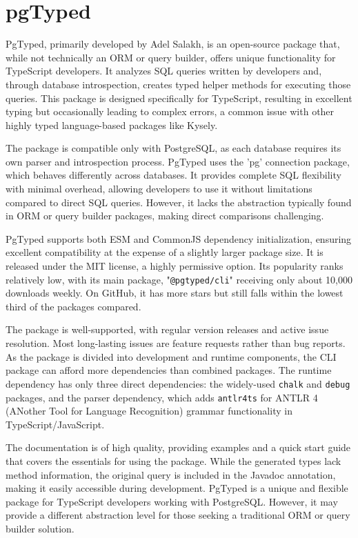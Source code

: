 \section{pgTyped}
PgTyped, primarily developed by Adel Salakh, is an open-source package that,
while not technically an ORM or query builder, offers unique functionality for
TypeScript developers. It analyzes SQL queries written by developers and,
through database introspection, creates typed helper methods for executing those
queries. This package is designed specifically for TypeScript, resulting in
excellent typing but occasionally leading to complex errors, a common issue with
other highly typed language-based packages like Kysely.

The package is compatible only with PostgreSQL, as each database requires its
own parser and introspection process. PgTyped uses the 'pg' connection package,
which behaves differently across databases. It provides complete SQL flexibility
with minimal overhead, allowing developers to use it without limitations
compared to direct SQL queries. However, it lacks the abstraction typically
found in ORM or query builder packages, making direct comparisons challenging.

PgTyped supports both ESM and CommonJS dependency initialization, ensuring
excellent compatibility at the expense of a slightly larger package size. It is
released under the MIT license, a highly permissive option. Its popularity ranks
relatively low, with its main package, "\texttt{@pgtyped/cli}" receiving only
about 10,000 downloads weekly. On GitHub, it has more stars but still falls
within the lowest third of the packages compared.

The package is well-supported, with regular version releases and active issue
resolution. Most long-lasting issues are feature requests rather than bug
reports. As the package is divided into development and runtime components, the
CLI package can afford more dependencies than combined packages. The runtime
dependency has only three direct dependencies: the widely-used \texttt{chalk}
and \texttt{debug} packages, and the parser dependency, which adds
\texttt{antlr4ts} for ANTLR 4 (ANother Tool for Language Recognition) grammar
functionality in TypeScript/JavaScript.

The documentation is of high quality, providing examples and a quick start guide
that covers the essentials for using the package. While the generated types lack
method information, the original query is included in the Javadoc annotation,
making it easily accessible during development. PgTyped is a unique and flexible
package for TypeScript developers working with PostgreSQL. However, it may
provide a different abstraction level for those seeking a traditional ORM or
query builder solution.
